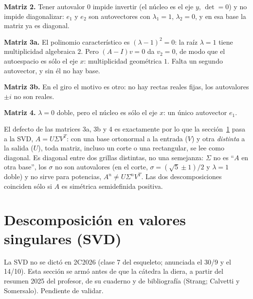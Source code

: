 \begin{resultado}
\textbf{Matriz 2.} Tener autovalor \(0\) impide invertir (el núcleo es el eje \(y\),
\(\det=0\)) y no impide diagonalizar: \(e_1\) y \(e_2\) son autovectores con
\(\lambda_1=1\), \(\lambda_2=0\), y en esa base la matriz ya es diagonal.

\textbf{Matriz 3a.} El polinomio característico es \((\lambda-1)^2=0\): la raíz
\(\lambda=1\) tiene multiplicidad algebraica \(2\). Pero \((A-I)v=0\) da \(v_2=0\), de modo
que el autoespacio es sólo el eje \(x\): multiplicidad geométrica \(1\). Falta un segundo
autovector, y sin él no hay base.

\textbf{Matriz 3b.} En el giro el motivo es otro: no hay rectas reales fijas, los
autovalores \(\pm i\) no son reales.

\textbf{Matriz 4.} \(\lambda=0\) doble, pero el núcleo es sólo el eje \(x\): un único
autovector \(e_1\).

El defecto de las matrices 3a, 3b y 4 es exactamente por lo que la sección~\ref{sec:svd}
pasa a la SVD, \(A=U\Sigma V^T\): con una base ortonormal a la entrada (\(V\)) y otra
\emph{distinta} a la salida (\(U\)), toda matriz, incluso un corte o una rectangular, se
lee como diagonal. Es diagonal entre dos grillas distintas, no una semejanza: \(\Sigma\) no
es ``\(A\) en otra base'', los \(\sigma\) no son autovalores (en el corte,
\(\sigma=(\sqrt5\pm1)/2\) y \(\lambda=1\) doble) y no sirve para potencias,
\(A^n\neq U\Sigma^nV^T\). Las dos descomposiciones coinciden sólo si \(A\) es simétrica
semidefinida positiva.
\end{resultado}

\section{Descomposición en valores singulares (SVD)}\label{sec:svd}

{\small\vspace{1mm}\par}
{\small\vspace{1mm}\par}


\begin{atencion}[Anticipado]
La SVD no se dictó en 2C2026 (clase 7 del esqueleto; anunciada el 30/9 y el 14/10). Esta
sección se armó antes de que la cátedra la diera, a partir del resumen 2025 del profesor,
de su cuaderno  y de bibliografía (Strang; Calvetti y Somersalo).
Pendiente de validar.
\end{atencion}

